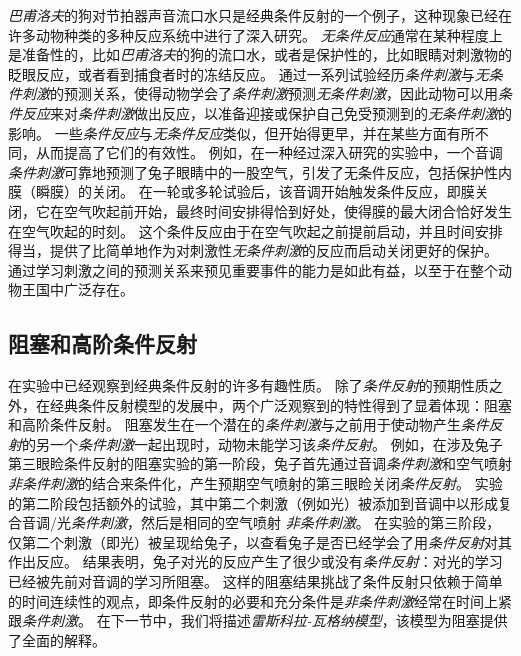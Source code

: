 \textit{巴甫洛夫}的狗对节拍器声音流口水只是经典条件反射的一个例子，这种现象已经在许多动物种类的多种反应系统中进行了深入研究。
\textit{无条件反应}通常在某种程度上是准备性的，比如\textit{巴甫洛夫}的狗的流口水，或者是保护性的，比如眼睛对刺激物的眨眼反应，或者看到捕食者时的冻结反应。
通过一系列试验经历\textit{条件刺激}与\textit{无条件刺激}的预测关系，使得动物学会了\textit{条件刺激}预测\textit{无条件刺激}，因此动物可以用\textit{条件反应}来对\textit{条件刺激}做出反应，以准备迎接或保护自己免受预测到的\textit{无条件刺激}的影响。
一些\textit{条件反应}与\textit{无条件反应}类似，但开始得更早，并在某些方面有所不同，从而提高了它们的有效性。
例如，在一种经过深入研究的实验中，一个音调\textit{条件刺激}可靠地预测了兔子眼睛中的一股空气，引发了无条件反应，包括保护性内膜（瞬膜）的关闭。
在一轮或多轮试验后，该音调开始触发条件反应，即膜关闭，它在空气吹起前开始，最终时间安排得恰到好处，使得膜的最大闭合恰好发生在空气吹起的时刻。
这个条件反应由于在空气吹起之前提前启动，并且时间安排得当，提供了比简单地作为对刺激性\textit{无条件刺激}的反应而启动关闭更好的保护。
通过学习刺激之间的预测关系来预见重要事件的能力是如此有益，以至于在整个动物王国中广泛存在。


\subsection{阻塞和高阶条件反射} \label{sec:blocking_higher_order}

在实验中已经观察到经典条件反射的许多有趣性质。
除了\textit{条件反射}的预期性质之外，在经典条件反射模型的发展中，两个广泛观察到的特性得到了显着体现：阻塞和高阶条件反射。
阻塞发生在一个潜在的\textit{条件刺激}与之前用于使动物产生\textit{条件反射}的另一个\textit{条件刺激}一起出现时，动物未能学习该\textit{条件反射}。
例如，在涉及兔子第三眼睑条件反射的阻塞实验的第一阶段，兔子首先通过音调\textit{条件刺激}和空气喷射 \textit{非条件刺激}的结合来条件化，产生预期空气喷射的第三眼睑关闭\textit{条件反射}。
实验的第二阶段包括额外的试验，其中第二个刺激（例如光）被添加到音调中以形成复合音调/光\textit{条件刺激}，然后是相同的空气喷射 \textit{非条件刺激}。
在实验的第三阶段，仅第二个刺激（即光）被呈现给兔子，以查看兔子是否已经学会了用\textit{条件反射}对其作出反应。
结果表明，兔子对光的反应产生了很少或没有\textit{条件反射}：对光的学习已经被先前对音调的学习所阻塞。
这样的阻塞结果挑战了条件反射只依赖于简单的时间连续性的观点，即条件反射的必要和充分条件是\textit{非条件刺激}经常在时间上紧跟\textit{条件刺激}。
在下一节中，我们将描述\textit{雷斯科拉-瓦格纳模型}\cite{rescorla1972theory}，该模型为阻塞提供了全面的解释。



